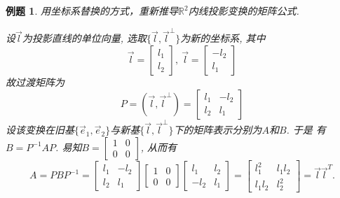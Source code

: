 \documentclass[a4paper]{book}
\newtheorem{eg}{例题}[chapter]
\begin{document}
\begin{eg}
用坐标系替换的方式，重新推导$\mathbb{R}^2$内线投影变换的矩阵公式.

设$\vec{l}$为投影直线的单位向量, 选取$\{\vec{l},\vec{l}^{\bot}\}$为新的坐标系, 其中
$$\vec{l}=\begin{bmatrix}l_1\\l_2\end{bmatrix},\ \vec{l}=\begin{bmatrix}-l_2\\l_1\end{bmatrix}$$
故过渡矩阵为
$$P=(\vec{l},\vec{l}^{\bot})=\begin{bmatrix} l_1&-l_2\\l_2&l_1\end{bmatrix}$$
设该变换在旧基$\{\vec{e}_1,\vec{e}_2\}$与新基$\{\vec{l},\vec{l}^{\bot}\}$下的矩阵表示分别为$A$和$B$. 于是
有$B=P^{-1}AP$. 易知$B=\begin{bmatrix}1&0\\0&0\end{bmatrix}$, 从而有
$$A=PBP^{-1}=\begin{bmatrix}l_1&-l_2\\l_2&l_1\end{bmatrix}\begin{bmatrix}1&0\\
0&0\end{bmatrix}\begin{bmatrix}l_1&l_2\\-l_2&l_1\end{bmatrix}=\begin{bmatrix}
l_1^2&l_1l_2\\l_1l_2&l_2^2\end{bmatrix}=\vec{l}\vec{l}^T.$$
\end{eg}
\end{document}
